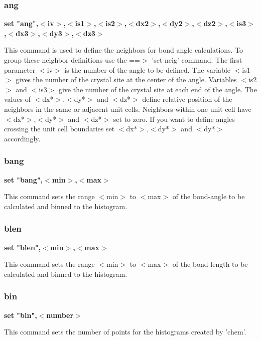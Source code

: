 \subsubsection{ang}
{\bf set "ang",$ <$iv$> $,$ <$is1$> $,$ <$is2$> $,$ <$dx2$> $,$ <$dy2$> $,$ <$dz2$> $,$ <$is3$> $,$ <$dx3$> $,$ <$dy3$> $,$ <$dz3$> $ \par }
\par
\vspace{3pt}
This command is used to define the neighbors for bond angle calculations. 
To group these neighbor definitions use the ==$> $ 'set neig' command. The 
first parameter $ <$iv$> $ is the number of the angle to be defined. The 
variable $ <$is1$> $ gives the number of the crystal site at the center of the 
angle. Variables $ <$is2$> $ and $ <$is3$> $ give the number of the crystal site at each 
end of the angle. The values of $ <$dx*$> $,$ <$dy*$> $ and $ <$dz*$> $ define relative 
position of the neighbors in the same or adjacent unit cells. Neighbors 
within one unit cell have $ <$dx*$> $,$ <$dy*$> $ and $ <$dz*$> $ set to zero. If you want 
to define angles crossing the unit cell boundaries set $ <$dx*$> $,$ <$dy*$> $ and 
$ <$dy*$> $ accordingly. 
\subsubsection{bang}
{\bf set "bang",$ <$min$> $,$ <$max$> $ \par }
\par
\vspace{3pt}
This command sets the range $ <$min$> $ to $ <$max$> $ of the bond-angle to be 
calculated and binned to the histogram. 
\subsubsection{blen}
{\bf set "blen",$ <$min$> $,$ <$max$> $ \par }
\par
\vspace{3pt}
This command sets the range $ <$min$> $ to $ <$max$> $ of the bond-length to be 
calculated and binned to the histogram. 
\subsubsection{bin}
{\bf set "bin",$ <$number$> $ \par }
\par
\vspace{3pt}
This command sets the number of points for the histograms created 
by 'chem'. 
